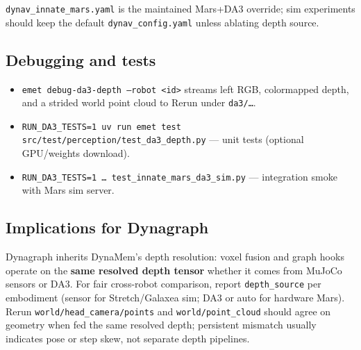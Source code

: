 \texttt{dynav\_innate\_mars.yaml} is the maintained Mars+DA3 override; sim experiments should keep the default \texttt{dynav\_config.yaml} unless ablating depth source.

\subsection{Debugging and tests}

\begin{itemize}
  \item \texttt{emet debug-da3-depth --robot <id>} streams left RGB, colormapped depth, and a strided world point cloud to Rerun under \texttt{da3/…}.
  \item \texttt{RUN\_DA3\_TESTS=1 uv run emet test src/test/perception/test\_da3\_depth.py} --- unit tests (optional GPU/weights download).
  \item \texttt{RUN\_DA3\_TESTS=1 … test\_innate\_mars\_da3\_sim.py} --- integration smoke with Mars sim server.
\end{itemize}

\subsection{Implications for Dynagraph}

Dynagraph inherits DynaMem's depth resolution: voxel fusion and graph hooks operate on the \textbf{same resolved depth tensor} whether it comes from MuJoCo sensors or DA3.
For fair cross-robot comparison, report \texttt{depth\_source} per embodiment (sensor for Stretch/Galaxea sim; DA3 or auto for hardware Mars).
Rerun \texttt{world/head\_camera/points} and \texttt{world/point\_cloud} should agree on geometry when fed the same resolved depth; persistent mismatch usually indicates pose or step skew, not separate depth pipelines.

